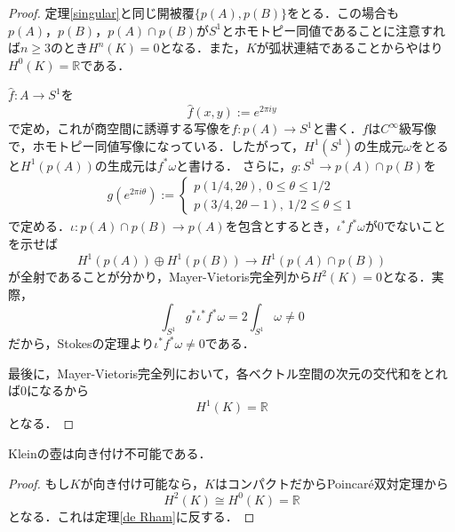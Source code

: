 \documentclass[uplatex]{jsarticle}
\begin{document}
\begin{proof}
  定理\ref{singular}と同じ開被覆$\{p(A),p(B)\}$をとる．この場合も$p(A)，p(B)，p(A)\cap p(B)$が$S^1$とホモトピー同値であることに注意すれば$n\geq 3$のとき$H^n(K)=0$となる．また，$K$が弧状連結であることからやはり$H^0(K)=\mathbb{R}$である．

  $\hat{f}\colon A\to S^1$を
  \[ \hat{f}(x,y):=e^{2\pi iy} \]
  で定め，これが商空間に誘導する写像を$f\colon p(A)\to S^1$と書く．$f$は$C^{\infty}$級写像で，ホモトピー同値写像になっている．したがって，$H^1(S^1)$の生成元$\omega$をとると$H^1(p(A))$の生成元は$f^*\omega$と書ける．
  さらに，$g\colon S^1\to p(A)\cap p(B)$を
  \begin{eqnarray*}
    g(e^{2\pi i\theta}):=
    \begin{cases}
      p(1/4,2\theta),\ 0\leq \theta \leq 1/2 \\
      p(3/4,2\theta-1),\ 1/2 \leq \theta \leq 1
    \end{cases}
  \end{eqnarray*}
  で定める．$\iota\colon p(A)\cap p(B)\to p(A)$を包含とするとき，$\iota^*f^*\omega$が0でないことを示せば
  \[ H^1(p(A))\oplus H^1(p(B))\to H^1(p(A)\cap p(B)) \]
  が全射であることが分かり，Mayer-Vietoris完全列から$H^2(K)=0$となる．実際，
  \[ \int_{S^1}g^*\iota^*f^*\omega=2\int_{S^1}\omega\neq 0 \]
  だから，Stokesの定理より$\iota^*f^*\omega\neq 0$である．

  最後に，Mayer-Vietoris完全列において，各ベクトル空間の次元の交代和をとれば0になるから
  \[ H^1(K)=\mathbb{R} \]
  となる．
\end{proof}
\begin{corollary}
  Kleinの壺は向き付け不可能である．
\end{corollary}
\begin{proof}
  もし$K$が向き付け可能なら，$K$はコンパクトだからPoincar\'e双対定理から
  \[ H^2(K)\cong H^0(K)=\mathbb{R} \]
  となる．これは定理\ref{de Rham}に反する．
\end{proof}
\end{document}
